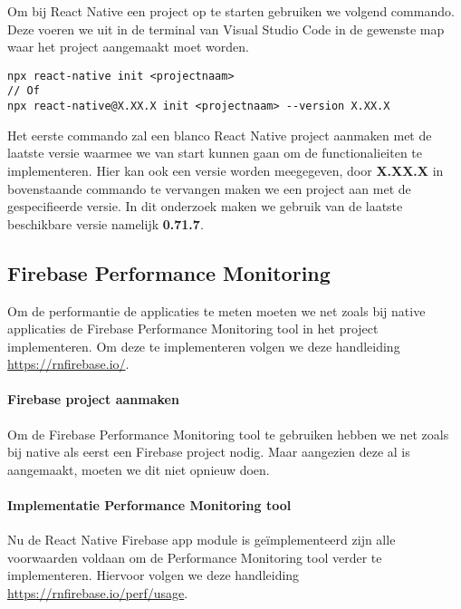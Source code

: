 Om bij React Native een project op te starten gebruiken we volgend commando. 
Deze voeren we uit in de terminal van Visual Studio Code in de gewenste map waar 
het project aangemaakt moet worden.
\begin{verbatim}
npx react-native init <projectnaam>
// Of
npx react-native@X.XX.X init <projectnaam> --version X.XX.X
\end{verbatim}


Het eerste commando zal een blanco React Native project aanmaken met de laatste versie 
waarmee we van start kunnen gaan om de functionalieiten te implementeren. Hier kan ook 
een versie worden meegegeven, door \textbf{X.XX.X} in bovenstaande commando te vervangen 
maken we een project aan met de gespecifieerde versie. In dit onderzoek maken we gebruik 
van de laatste beschikbare versie namelijk \textbf{0.71.7}.

\subsection{Firebase Performance Monitoring}
Om de performantie de applicaties te meten moeten we net zoals bij native applicaties de 
Firebase Performance Monitoring tool in het project implementeren. Om deze te implementeren 
volgen we deze handleiding \url{https://rnfirebase.io/}.

\paragraph{Firebase project aanmaken}
Om de Firebase Performance Monitoring tool te gebruiken hebben we net zoals bij native 
als eerst een Firebase project nodig. Maar aangezien deze al is aangemaakt, moeten we dit 
niet opnieuw doen.



\paragraph{Implementatie Performance Monitoring tool}
Nu de React Native Firebase app module is geïmplementeerd zijn alle voorwaarden voldaan om de 
Performance Monitoring tool verder te implementeren. Hiervoor volgen we deze handleiding 
\url{https://rnfirebase.io/perf/usage}.



